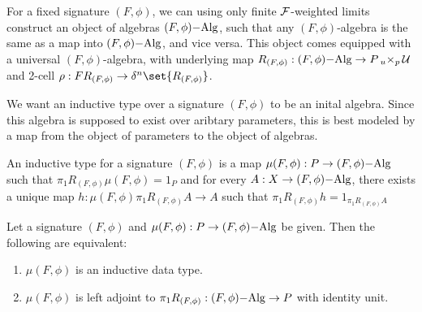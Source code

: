 \documentclass[../thesis.tex]{subfiles}
\begin{document}
\begin{remark}
  For a fixed signature $(F,\phi)$, we can using only finite $\cF$-weighted limits construct an object
  of algebras $(F,\phi)\Alg$, such that any $(F,\phi)$-algebra is the same as a map into $(F,\phi)\Alg$,
  and vice versa. This object comes equipped with a universal $(F,\phi)$-algebra, with underlying map
  $R_{(F,\phi)} : (F,\phi) \Alg \to P \pb[u]{p} \cU$ and 2-cell $\rho : F R_{(F,\phi)} \to \delta^n\set
  {R_{(F,\phi)}}$.
\end{remark}

We want an inductive type over a signature $(F,\phi)$ to be an inital algebra. Since this algebra is supposed
to exist over aribtary parameters, this is best modeled by a map from the object of parameters to the object
of algebras.

\begin{definition}
  An inductive type for a signature $(F,\phi)$ is a map $\mu(F,\phi) : P \to (F,\phi)\Alg$ such that
  $\pi_1 R_{(F,\phi)} \mu(F,\phi) = 1_P$ and for every $A : X \to (F,\phi)\Alg$, there exists a unique
  map $h : \mu(F,\phi)\pi_1R_{(F,\phi)} A \to A$ such that $\pi_1R_{(F,\phi)} h = 1_{\pi_1R_{(F,\phi)}A}$
\end{definition}
\begin{lemma}
  Let a signature $(F,\phi)$ and $\mu(F,\phi) : P \to (F,\phi)\Alg$ be given. Then the following are equivalent:
  \begin{enumerate}
    \item $\mu(F,\phi)$ is an inductive data type.
    \item $\mu(F,\phi)$ is left adjoint to $\pi_1 R_{(F,\phi)} : (F,\phi)\Alg \to P$ with identity unit.
  \end{enumerate}
\end{lemma}
\end{document}
